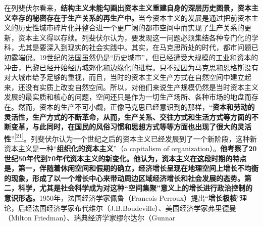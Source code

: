 \documentclass[UTF8, fontset = sourcesans, a4paper, oneside, zihao =
-4, scheme=chinese, no-math, space=true]{ctexbook}
\begin{document}
在列斐伏尔看来，\textbf{结构主义未能勾画出资本主义重建自身的深层历史图景，资本主义幸存的秘密存在于生产关系的再生产中。}当今资本主义的发展是通过把前资本主义的历史性城市碎片化并整合进一个更广阔的都市空间中而实现了生产关系的更新，资本主义得以存续。列斐伏尔认为，要发现这一问题必须集结各种专门化的学科，尤其是要深入到现实的社会实践中。其实，在马克思所处的时代，都市问题已初露端倪。19世纪的法国虽然仍是``历史城市''，但已经遭受大规模的工业和资本的冲击，巴黎已经开始经历城郊化和边缘化的进程。只不过因为马克思和恩格斯没有对大城市给予足够的重视，而且，当时的资本主义生产方式在自然空间中建立起来，还没有实质上改变自然空间。所以，对他们来说生产规模仍然是当时资本主义发展的最实质和核心的问题，空间还只是作为一切生产场所、各种市场的地盘而存在。然而，资本的生产不可小觑，正像马克思已经意识到的那样，``\textbf{资本和劳动的灵活性，生产方式的不断革命，从而，生产关系、交往方式和生活方式等方面的不断变革，与此同时，在国民的风俗习惯和思想方式等等方面也出现了很大的灵活性}''\protect\hypertarget{part0007_split_001.htmlux5cux23w21}{}{}\protect\hyperlink{part0007_split_004.htmlux5cux23m21}{\textsuperscript{{[}21{]}}}。列斐伏尔认为一个世纪之后的资本主义已经发展到了一个新阶段，这种新资本主义是一种``\textbf{组织化的资本主义}''（a
capitalism of
organization）。\textbf{他考察了20世纪50年代到70年代资本主义的新变化。他认为，资本主义在这段时期的特点是，第一，伴随着休闲空间和假期的确立，经济增长呈现在地理空间上增长不均衡的现象，形成了以一个增长中心来带动周边区域经济增长和社会发展的态势。第二，科学，尤其是社会科学成为对这种``空间集聚''意义上的增长进行政治控制的意识形态。}1950年，法国经济学家佩鲁（Francois
Perroux）提出``\textbf{增长极核}''理论，后经法国经济学家布代维尔（J.B.Boudeville）、美国经济学家弗里德曼（Milton
Friedman）、瑞典经济学家缪尔达尔（Gunnar
\end{document}
